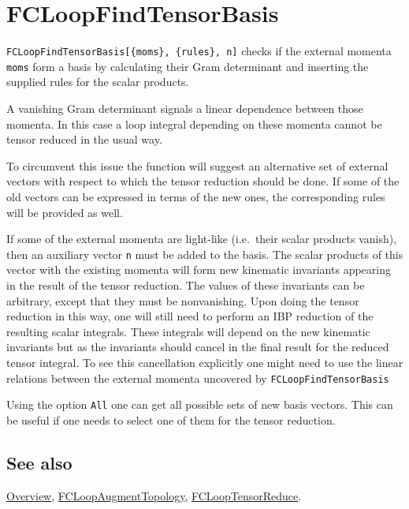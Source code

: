 \documentclass[../FeynCalcManual.tex]{subfiles}
\begin{document}
\hypertarget{fcloopfindtensorbasis}{
\section{FCLoopFindTensorBasis}\label{fcloopfindtensorbasis}}

\texttt{FCLoopFindTensorBasis[\allowbreak{}\{\allowbreak{}moms\},\ \allowbreak{}\{\allowbreak{}rules\},\ \allowbreak{}n]}
checks if the external momenta \texttt{moms} form a basis by calculating
their Gram determinant and inserting the supplied rules for the scalar
products.

A vanishing Gram determinant signals a linear dependence between those
momenta. In this case a loop integral depending on these momenta cannot
be tensor reduced in the usual way.

To circumvent this issue the function will suggest an alternative set of
external vectors with respect to which the tensor reduction should be
done. If some of the old vectors can be expressed in terms of the new
ones, the corresponding rules will be provided as well.

If some of the external momenta are light-like (i.e.~their scalar
products vanish), then an auxiliary vector \texttt{n} must be added to
the basis. The scalar products of this vector with the existing momenta
will form new kinematic invariants appearing in the result of the tensor
reduction. The values of these invariants can be arbitrary, except that
they must be nonvanishing. Upon doing the tensor reduction in this way,
one will still need to perform an IBP reduction of the resulting scalar
integrals. These integrals will depend on the new kinematic invariants
but as the invariants should cancel in the final result for the reduced
tensor integral. To see this cancellation explicitly one might need to
use the linear relations between the external momenta uncovered by
\texttt{FCLoopFindTensorBasis}

Using the option \texttt{All} one can get all possible sets of new basis
vectors. This can be useful if one needs to select one of them for the
tensor reduction.

\subsection{See also}

\hyperlink{toc}{Overview},
\hyperlink{fcloopaugmenttopology}{FCLoopAugmentTopology},
\hyperlink{fclooptensorreduce}{FCLoopTensorReduce}.
\end{document}
